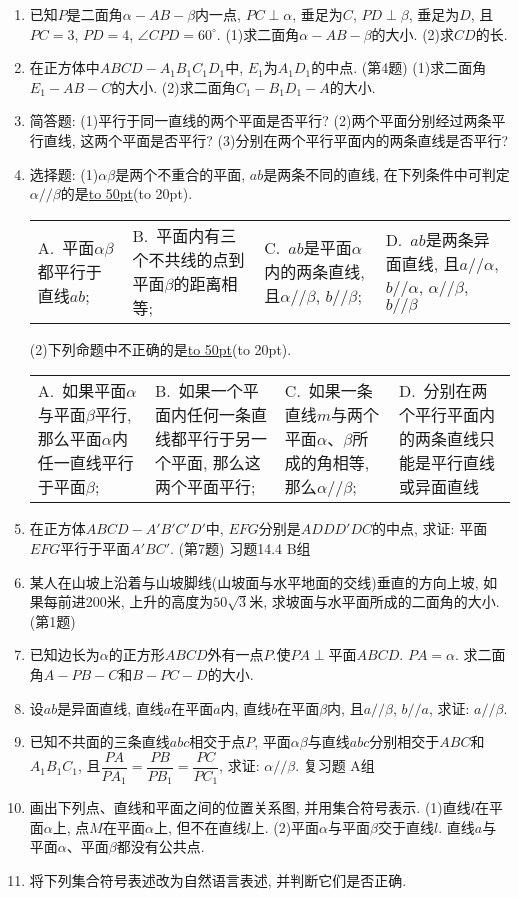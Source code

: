 \documentclass[10pt,a4paper]{article}
\newcommand{\blank}[1]{\underline{\hbox to #1pt{}}}
\newcommand{\bracket}[1]{(\hbox to #1pt{})}
\newcommand{\fourch}[4]{\par\begin{tabular}{p{.23\textwidth}p{.23\textwidth}p{.23\textwidth}p{.23\textwidth}}
A.~#1 &B.~#2& C.~#3& D.~#4
\end{tabular}}
\begin{document}
\begin{enumerate}[1.]
\item 已知$P$是二面角$\alpha -AB-\beta$内一点, $PC\perp \alpha$, 垂足为$C$, $PD\perp \beta$, 垂足为$D$, 且$PC=3$, $PD=4$, $\angle CPD=60^\circ$.
(1)求二面角$\alpha -AB-\beta$的大小.
(2)求$CD$的长.
\item 在正方体中$ABCD-A_1B_1C_1D_1$中, $E_1$为$A_1D_1$的中点.
(第4题)
(1)求二面角$E_1-AB-C$的大小.
(2)求二面角$C_1-B_1D_1-A$的大小.
\item 简答题:
(1)平行于同一直线的两个平面是否平行?
(2)两个平面分别经过两条平行直线, 这两个平面是否平行?
(3)分别在两个平行平面内的两条直线是否平行?
\item 选择题:
(1)$\alpha \beta$是两个不重合的平面, $ab$是两条不同的直线, 在下列条件中可判定$\alpha //\beta$的是\blank{50}\bracket{20}.
\fourch{平面$\alpha \beta$都平行于直线$ab$;}{平面内有三个不共线的点到平面$\beta$的距离相等;}{$ab$是平面$\alpha$内的两条直线, 且$\alpha //\beta$, $b//\beta$;}{$ab$是两条异面直线, 且$a//\alpha$, $b//\alpha$, $\alpha //\beta$, $b//\beta$}
(2)下列命题中不正确的是\blank{50}\bracket{20}.
\fourch{如果平面$\alpha$与平面$\beta$平行, 那么平面$\alpha$内任一直线平行于平面$\beta$;}{如果一个平面内任何一条直线都平行于另一个平面, 那么这两个平面平行;}{如果一条直线$m$与两个平面$\alpha$、$\beta$所成的角相等, 那么$\alpha //\beta$;}{分别在两个平行平面内的两条直线只能是平行直线或异面直线}
\item 在正方体$ABCD-A'B'C'D'$中, $EFG$分别是$ADDD'DC$的中点, 求证: 平面$EFG$平行于平面$A'BC'$.
(第7题)
习题14.4 B组
\item 某人在山坡上沿着与山坡脚线(山坡面与水平地面的交线)垂直的方向上坡, 如果每前进200米, 上升的高度为$50\sqrt 3$米, 求坡面与水平面所成的二面角的大小.
(第1题)
\item 已知边长为$\alpha$的正方形$ABCD$外有一点$P$.使$PA\perp$平面$ABCD$. $PA=\alpha$. 求二面角$A-PB-C$和$B-PC-D$的大小.
\item 设$ab$是异面直线, 直线$a$在平面$a$内, 直线$b$在平面$\beta$内, 且$a//\beta$, $b//a$, 求证: $a//\beta$.
\item 已知不共面的三条直线$abc$相交于点$P$, 平面$\alpha \beta$与直线$abc$分别相交于$ABC$和$A_1B_1C_1$, 且$\dfrac{PA}{P{A_1}}=\dfrac{PB}{P{B_1}}=\dfrac{PC}{P{C_1}}$, 求证: $\alpha //\beta$.
复习题
A组
\item 画出下列点、直线和平面之间的位置关系图, 并用集合符号表示.
(1)直线$l$在平面$\alpha$上, 点$M$在平面$\alpha$上, 但不在直线$l$上.
(2)平面$\alpha$与平面$\beta$交于直线$l$. 直线$a$与平面$\alpha$、平面$\beta$都没有公共点.
\item 将下列集合符号表述改为自然语言表述, 并判断它们是否正确.

\end{enumerate}
\end{document}
